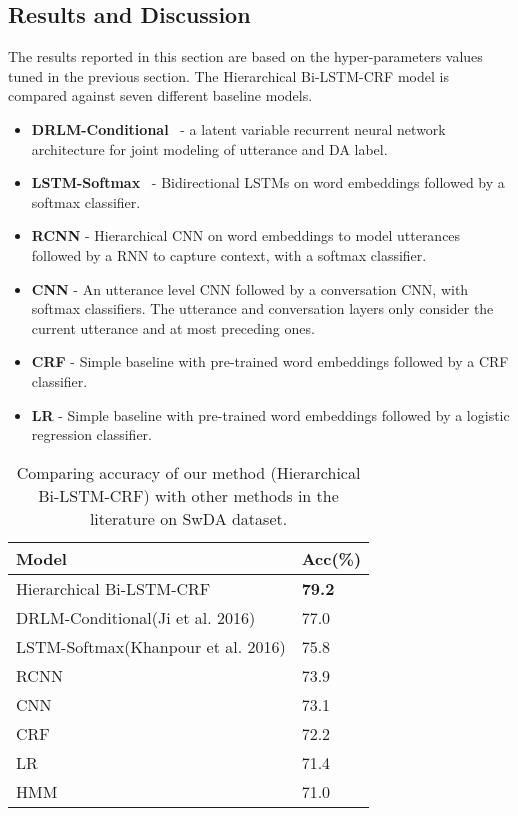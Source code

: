 \documentclass[letterpaper]{article} \usepackage{aaai18}
\begin{document}
\subsection{Results and Discussion}
The results reported in this section are based on the hyper-parameters values tuned in the previous section. The Hierarchical Bi-LSTM-CRF model is compared against seven different baseline models. 
\begin{itemize}
  \item \textbf{DRLM-Conditional}~\cite{Ji2016} - a latent variable recurrent neural network architecture for joint modeling of utterance and DA label. 
  \item \textbf{LSTM-Softmax}~\cite{Khanpour2016} - Bidirectional LSTMs on word embeddings followed by a softmax classifier. 
  \item \textbf{RCNN}\cite{Blunsom2013} - Hierarchical CNN on word embeddings to model utterances followed by a RNN to capture context, with a softmax classifier.
  \item \textbf{CNN}\cite{Lee2016} - An utterance level CNN followed by a conversation CNN, with softmax classifiers. The utterance and conversation layers only consider the current utterance and at most  preceding ones.
  \item \textbf{CRF} - Simple baseline with pre-trained word embeddings followed by a CRF classifier.
  \item \textbf{LR} - Simple baseline with pre-trained word embeddings followed by a logistic regression classifier.
\end{itemize}
\begin{table}[!htb]
  \center
  \small
  \begin{tabular}{| l | l |}
    \hline
    \textbf{Model} 						& \textbf{Acc(\%)} 	\\
    \hline
    Hierarchical Bi-LSTM-CRF 			& \textbf{79.2} 	\\
DRLM-Conditional(Ji et al. 2016) 	& 77.0 				\\
    LSTM-Softmax(Khanpour et al. 2016)	& 75.8\footnotemark	\\
    RCNN\cite{Blunsom2013} 				& 73.9 				\\
    CNN\cite{Lee2016} 					& 73.1 				\\
    CRF 								& 72.2				\\
    LR 									& 71.4				\\
    HMM\cite{Stolcke2006} 				& 71.0 				\\
    \hline
  \end{tabular}
  \caption{Comparing accuracy of our method (Hierarchical Bi-LSTM-CRF) with other methods in the literature on SwDA dataset. }
  \label{table:results}
\end{table}
\end{document}
